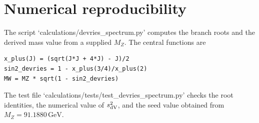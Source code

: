 \section{Numerical reproducibility}
\label{app:numerics}

The script `calculations/devries\_spectrum.py' computes the branch roots and the derived mass value from a supplied \(M_Z\).  The central functions are
\begin{verbatim}
x_plus(J) = (sqrt(J*J + 4*J) - J)/2
sin2_devries = 1 - x_plus(3/4)/x_plus(2)
MW = MZ * sqrt(1 - sin2_devries)
\end{verbatim}
The test file `calculations/tests/test\_devries\_spectrum.py' checks the root identities, the numerical value of \(s^2_{\rm dV}\), and the seed value obtained from \(M_Z=91.1880\,\mathrm{GeV}\).
